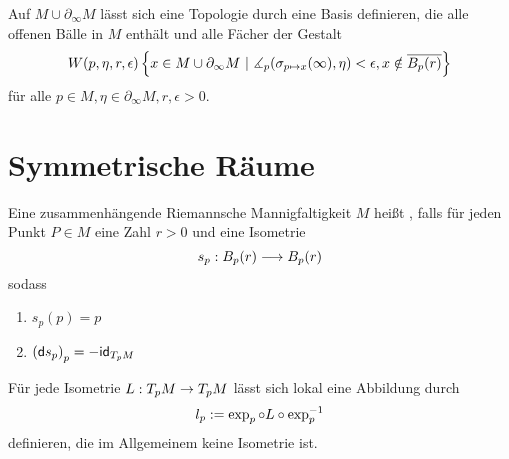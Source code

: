 \documentclass{book}
\renewcommand{\d}{\textsf{d}}
\renewcommand{\l}[1]{\overline{#1}}
\begin{document}
\Bem{}
Auf $M\cup \partial_\infty M$ lässt sich eine Topologie durch eine Basis definieren, die alle offenen Bälle in $M$ enthält und alle Fächer der Gestalt
\[ W(p,\eta, r, \epsilon)\set{x \in M \cup \partial_\infty M}{ \measuredangle_p(\sigma_{p\mapsto x}(\infty), \eta) < \epsilon, x \notin \l{B_p(r)} } \]
für alle $p \in M, \eta \in \partial_\infty M, r, \epsilon > 0$.



\newpage
\section{Symmetrische Räume}
Eine zusammenhängende Riemannsche Mannigfaltigkeit $M$ heißt , falls für jeden Punkt $P \in M$ eine Zahl $r > 0$ und eine Isometrie
\[ s_p : B_p(r) \overset{}{\longrightarrow} B_p(r) \]
sodass
\begin{enumerate}[1.)]
\item $s_p(p) = p$
\item $\klam{\d s_p}_{p} = - \id{T_pM}$
\end{enumerate}

\Bem{}
Für jede Isometrie $L : T_pM \overset{}{\rightarrow} T_pM$ lässt sich lokal eine Abbildung durch
\[ l_p := \exp_p \circ L \circ \exp_{p}^{-1} \]
definieren, die im Allgemeinem keine Isometrie ist.
\end{document}

